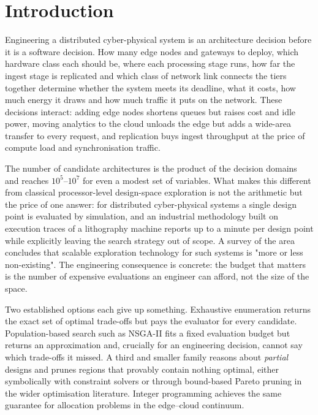 \section*{Introduction}
\label{sec:ce:intro}

Engineering a distributed cyber-physical system is an architecture decision before it is
a software decision. How many edge nodes and gateways to deploy, which hardware class
each should be, where each processing stage runs, how far the ingest stage is replicated
and which class of network link connects the tiers together determine whether the system
meets its deadline, what it costs, how much energy it draws and how much traffic it puts
on the network. These decisions interact: adding edge nodes shortens queues but raises
cost and idle power, moving analytics to the cloud unloads the edge but adds a wide-area
transfer to every request, and replication buys ingest throughput at the price of
compute load and synchronisation traffic.

The number of candidate architectures is the product of the decision domains and reaches
$10^{5}$--$10^{7}$ for even a modest set of variables. What makes this different from
classical processor-level design-space exploration is not the arithmetic but the price of
one answer: for distributed cyber-physical systems a single design point is evaluated by
simulation, and an industrial methodology built on execution traces of a lithography
machine reports up to a minute per design point while explicitly leaving the search
strategy out of scope\cite{saadatmand2025compdse}. A survey of the area concludes that
scalable exploration technology for such systems is "more or less
non-existing"\cite{herget2022dse}. The engineering consequence is concrete: the budget
that matters is the number of expensive evaluations an engineer can afford, not the size
of the space.

Two established options each give up something. Exhaustive enumeration returns the exact
set of optimal trade-offs but pays the evaluator for every candidate. Population-based
search such as NSGA-II\cite{deb2002nsga2} fits a fixed evaluation budget but returns an
approximation and, crucially for an engineering decision, cannot say which trade-offs it
missed. A third and smaller family reasons about \emph{partial} designs and prunes
regions that provably contain nothing optimal, either symbolically with constraint
solvers\cite{neubauer2018exact,lukasiewycz2008symbolic} or through bound-based Pareto
pruning in the wider optimisation
literature\cite{paretopruning2022,mandow2010namoa}. Integer programming achieves the same
guarantee for allocation problems in the edge--cloud
continuum\cite{kouloumpris2024optimization,kouloumpris2026reliability}.

